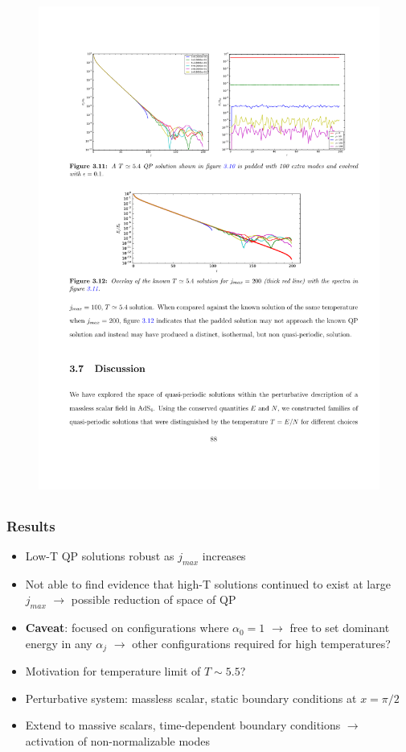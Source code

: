 \documentclass[mathserif,10pt]{beamer}
\newcommand{\bi}{\begin{itemize}}
\newcommand{\ei}{\end{itemize}}
\newcommand{\its}{\item}
\newcommand{\jm}{j_{max}}
\begin{document}
{\begin{overlayarea}{\textwidth}{0.65\textheight}
\begin{figure}
{      \includegraphics[scale=1.0]{TTFEvo}
      }
      \end{figure}
  \end{overlayarea}
}


\subsection*{}
\frame
{
  \frametitle{Results}
    \bi
    \its Low-T QP solutions robust as $\jm$ increases
    \its Not able to find evidence that high-T solutions continued to exist at large $\jm$ $\to$ possible reduction of space of QP
    \its {\bf Caveat}: focused on configurations where $\alpha_0 = 1$ $\to$ free to set dominant energy in any $\alpha_j$ $\to$ other configurations required for high temperatures?
    \its Motivation for temperature limit of $T \sim 5.5$?
    \its Perturbative system: massless scalar, static boundary conditions at $x = \pi/2$
    \its Extend to massive scalars, time-dependent boundary conditions $\to$ activation of non-normalizable modes
    \ei
}
\end{document}

